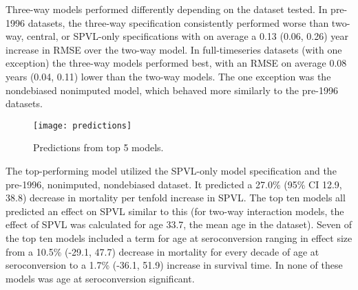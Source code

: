 \documentclass[12pt, titlepage, proquest]{article}
\begin{document}
Three-way models performed differently depending on the dataset tested. In pre-1996 datasets, the three-way specification consistently performed worse than two-way, central, or SPVL-only specifications with on average a 0.13 (0.06, 0.26) year increase in RMSE over the two-way model. In full-timeseries datasets (with one exception) the three-way models performed best, with an RMSE on average 0.08 years (0.04, 0.11) lower than the two-way models. The one exception was the nondebiased nonimputed model, which behaved more similarly to the pre-1996 datasets.

\begin{figure}
	\caption{Predictions from top 5 models.}
	\label{predictions}
	\centering
		\texttt{[image: predictions]}
\end{figure}

The top-performing model utilized the SPVL-only model specification and the pre-1996, nonimputed, nondebiased dataset. It predicted a 27.0\% (95\% CI 12.9, 38.8) decrease in mortality per tenfold increase in SPVL. The top ten models all predicted an effect on SPVL similar to this (for two-way interaction models, the effect of SPVL was calculated for age 33.7, the mean age in the dataset). Seven of the top ten models included a term for age at seroconversion ranging in effect size from a 10.5\% (-29.1, 47.7) decrease in mortality for every decade of age at seroconversion to a 1.7\% (-36.1, 51.9) increase in survival time. In none of these models was age at seroconversion significant. 
\end{document}
